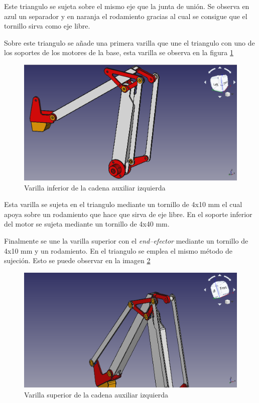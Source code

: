Este triangulo se sujeta sobre el mismo eje que la junta de unión.
Se observa en azul un separador y en naranja el rodamiento gracias al cual se consigue que el tornillo sirva como eje libre.

Sobre este triangulo se añade una primera varilla que une el triangulo con uno de los soportes de los motores de la base, esta varilla se observa en la figura \ref{fig:varilla_inferior_izquierda}

\begin{figure}[H]
    \centering 
    \includegraphics[width=1\linewidth]{pictures/VarillaInferior.png}
    \caption{Varilla inferior de la cadena auxiliar izquierda}
    \label{fig:varilla_inferior_izquierda}
\end{figure}

Esta varilla se sujeta en el triangulo mediante un tornillo de 4x10 mm el cual apoya sobre un rodamiento que hace que sirva de eje libre. En el soporte inferior del motor se sujeta mediante un tornillo de 4x40 mm.

Finalmente se une la varilla superior con el \textit{end--efector} mediante un tornillo de 4x10 mm y un rodamiento. En el triangulo se emplea el mismo método de sujeción. Esto se puede observar en la imagen \ref{fig:varilla_superior_izquierda}

\begin{figure}[H]
    \centering 
    \includegraphics[width=1\linewidth]{pictures/VarillaSuperior.png}
    \caption{Varilla superior de la cadena auxiliar izquierda}
    \label{fig:varilla_superior_izquierda}
\end{figure}

